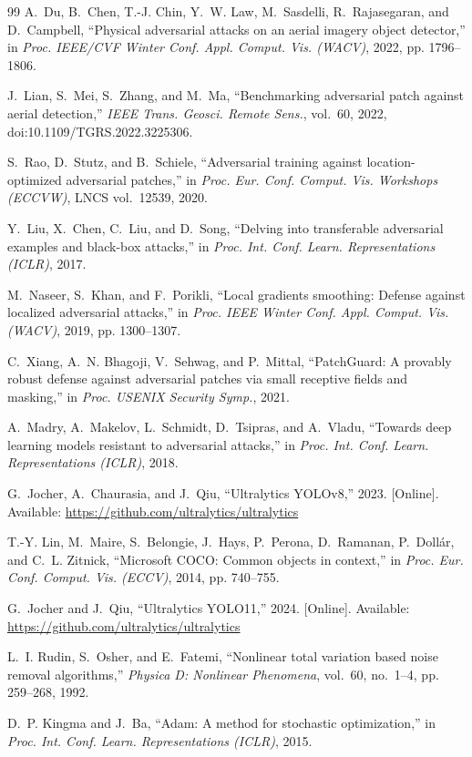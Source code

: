 \documentclass[conference]{IEEEtran}
\begin{document}
\begin{thebibliography}{99}
A.~Du, B.~Chen, T.-J. Chin, Y.~W. Law, M.~Sasdelli, R.~Rajasegaran, and D.~Campbell,
``Physical adversarial attacks on an aerial imagery object detector,'' in \emph{Proc.
IEEE/CVF Winter Conf. Appl. Comput. Vis. (WACV)}, 2022, pp. 1796--1806.

J.~Lian, S.~Mei, S.~Zhang, and M.~Ma, ``Benchmarking adversarial patch against aerial
detection,'' \emph{IEEE Trans. Geosci. Remote Sens.}, vol.~60, 2022,
doi:10.1109/TGRS.2022.3225306.

S.~Rao, D.~Stutz, and B.~Schiele, ``Adversarial training against location-optimized
adversarial patches,'' in \emph{Proc. Eur. Conf. Comput. Vis. Workshops (ECCVW)}, LNCS
vol.~12539, 2020.

Y.~Liu, X.~Chen, C.~Liu, and D.~Song, ``Delving into transferable adversarial examples and
black-box attacks,'' in \emph{Proc. Int. Conf. Learn. Representations (ICLR)}, 2017.

M.~Naseer, S.~Khan, and F.~Porikli, ``Local gradients smoothing: Defense against localized
adversarial attacks,'' in \emph{Proc. IEEE Winter Conf. Appl. Comput. Vis. (WACV)}, 2019,
pp. 1300--1307.

C.~Xiang, A.~N. Bhagoji, V.~Sehwag, and P.~Mittal, ``PatchGuard: A provably robust defense
against adversarial patches via small receptive fields and masking,'' in \emph{Proc. USENIX
Security Symp.}, 2021.

A.~Madry, A.~Makelov, L.~Schmidt, D.~Tsipras, and A.~Vladu, ``Towards deep learning models
resistant to adversarial attacks,'' in \emph{Proc. Int. Conf. Learn. Representations
(ICLR)}, 2018.

G.~Jocher, A.~Chaurasia, and J.~Qiu, ``Ultralytics YOLOv8,'' 2023. [Online]. Available:
\url{https://github.com/ultralytics/ultralytics}

T.-Y. Lin, M.~Maire, S.~Belongie, J.~Hays, P.~Perona, D.~Ramanan, P.~Doll\'{a}r, and
C.~L. Zitnick, ``Microsoft COCO: Common objects in context,'' in \emph{Proc. Eur. Conf.
Comput. Vis. (ECCV)}, 2014, pp. 740--755.

G.~Jocher and J.~Qiu, ``Ultralytics YOLO11,'' 2024. [Online]. Available:
\url{https://github.com/ultralytics/ultralytics}

L.~I. Rudin, S.~Osher, and E.~Fatemi, ``Nonlinear total variation based noise removal
algorithms,'' \emph{Physica D: Nonlinear Phenomena}, vol.~60, no.~1--4, pp. 259--268, 1992.

D.~P. Kingma and J.~Ba, ``Adam: A method for stochastic optimization,'' in \emph{Proc. Int.
Conf. Learn. Representations (ICLR)}, 2015.

\end{thebibliography}
\end{document}
